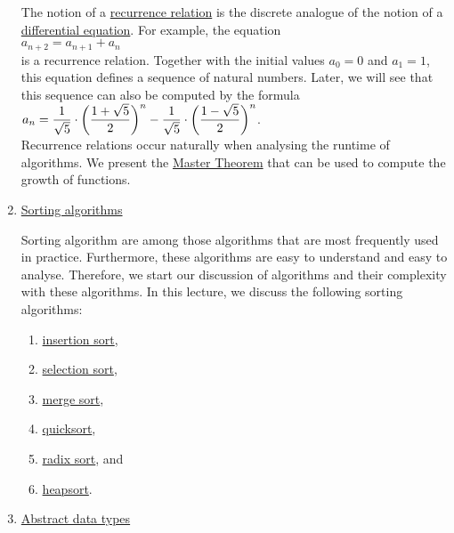 \begin{enumerate}
      The notion of a \href{http://en.wikipedia.org/wiki/Recurrence_relation}{recurrence relation}
      is the discrete analogue of the notion of a 
      \href{http://en.wikipedia.org/wiki/Differential_equation}{differential equation}.
      For example, the equation
      \\[0.2cm]
      \hspace*{1.3cm}
      $a_{n+2} = a_{n+1} + a_n$
      \\[0.2cm]
      is a recurrence relation.  Together with the initial values $a_0 = 0$ and $a_1 = 1$, this equation
      defines a sequence of natural numbers.  Later, we will see that this sequence can also be computed by
      the formula
      \\[0.2cm]
      \hspace*{1.3cm}
      $\displaystyle a_{n} = \frac{1}{\sqrt{5}} \cdot \biggl(\frac{1+\sqrt{5}}{2}\biggr)^n - \frac{1}{\sqrt{5}} \cdot \biggl(\frac{1-\sqrt{5}}{2}\biggr)^n$.
      \\[0.2cm]
      Recurrence relations occur naturally when analysing the runtime of algorithms.  We present the 
      \href{https://en.wikipedia.org/wiki/Master_theorem_(analysis_of_algorithms)}{Master Theorem} that can
      be used to compute the growth of  functions.
\item \href{http://en.wikipedia.org/wiki/Sorting_algorithm}{Sorting algorithms}

      Sorting algorithm are among those algorithms that are most frequently used in practice.  Furthermore,
      these algorithms are easy to understand and easy to analyse.  Therefore, we start our discussion of
      algorithms and their complexity with these algorithms.  In this lecture, we discuss the following
      sorting algorithms: 
      \begin{enumerate}
      \item \href{http://en.wikipedia.org/wiki/Insertion_sort}{insertion sort},
      \item \href{http://en.wikipedia.org/wiki/Selection_sort}{selection sort},
      \item \href{http://en.wikipedia.org/wiki/Merge_sort}{merge sort}, 
      \item \href{http://en.wikipedia.org/wiki/Quicksort}{quicksort}, 
      \item \href{http://en.wikipedia.org/wiki/Radix_sort}{radix sort}, and
      \item \href{https://en.wikipedia.org/wiki/Heapsort}{heapsort}.
      \end{enumerate}
\item \href{http://en.wikipedia.org/wiki/Abstract_data_types}{Abstract data types}


\end{enumerate}
